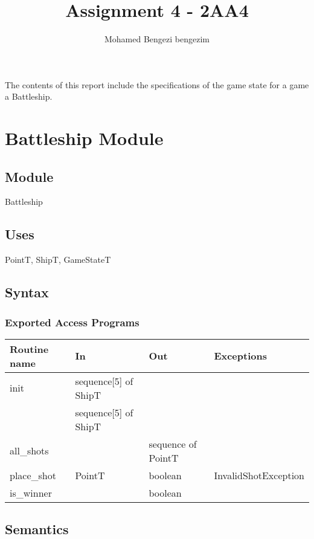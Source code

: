 \documentclass[12pt]{article}
\title{Assignment 4 - 2AA4}
\author{Mohamed Bengezi bengezim}
\begin{document}
\maketitle
The contents of this report include the specifications of the game state for a game a Battleship.

\newpage

\section* {Battleship Module}

\subsection* {Module}

Battleship

\subsection* {Uses}

PointT, ShipT, GameStateT

\subsection* {Syntax}

\subsubsection* {Exported Access Programs}

\begin{tabular}{| l | l | l | p{4cm} |}
\hline
\textbf{Routine name} & \textbf{In} & \textbf{Out} & \textbf{Exceptions}\\
\hline
init & sequence[5] of ShipT&  & \\
  & sequence[5] of ShipT &  & \\
\hline
all\_shots & & sequence of PointT & \\
\hline
place\_shot & PointT & boolean & InvalidShotException\\
\hline
is\_winner &  & boolean & \\
\hline


\end{tabular}

\subsection* {Semantics}
\end{document}
